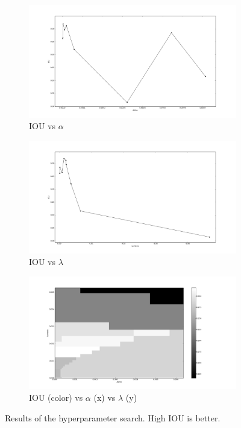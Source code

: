 \begin{figure}[h]
	\centering
	\begin{subfigure}{0.32\textwidth}
		\centering
                \includegraphics[width=\textwidth]{plots/hs4_alpha.png}
         \caption{IOU vs $\alpha$}
	\end{subfigure}
	\begin{subfigure}{0.32\textwidth}
		\centering
                \includegraphics[width=\textwidth]{plots/hs4_lambda.png}
         \caption{IOU vs $\lambda$}
	\end{subfigure}
	\begin{subfigure}{0.32\textwidth}
		\centering
                \includegraphics[width=\textwidth]{plots/hs4_pcolor.png}
         \caption{IOU (color) vs $\alpha$ (x) vs $\lambda$ (y)}
	\end{subfigure}
	\caption[Hyperparameter search for Experiment 2]{Results of the hyperparameter search. High IOU is better.}
	 \label{fig:Hs4}
\end{figure}

